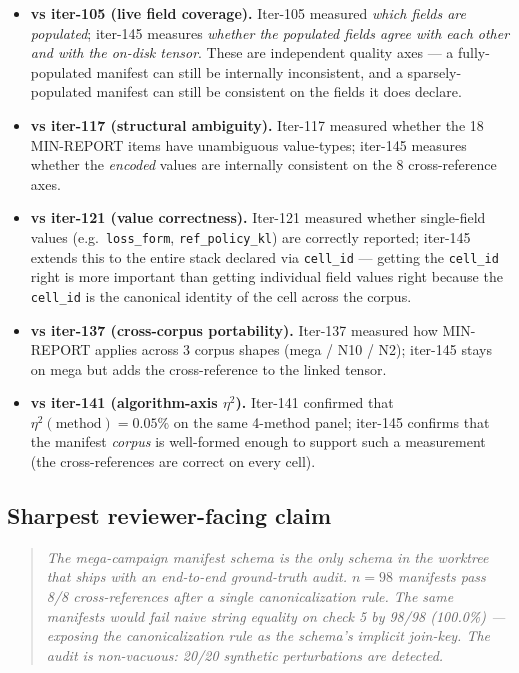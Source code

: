 \begin{itemize}
\item \textbf{vs iter-105 (live field coverage).} Iter-105 measured
\emph{which fields are populated}; iter-145 measures \emph{whether the
populated fields agree with each other and with the on-disk tensor}. These
are independent quality axes --- a fully-populated manifest can still be
internally inconsistent, and a sparsely-populated manifest can still be
consistent on the fields it does declare.

\item \textbf{vs iter-117 (structural ambiguity).} Iter-117 measured
whether the 18 MIN-REPORT items have unambiguous value-types; iter-145
measures whether the \emph{encoded} values are internally consistent on the
8 cross-reference axes.

\item \textbf{vs iter-121 (value correctness).} Iter-121 measured whether
single-field values (e.g.\ \texttt{loss\_form}, \texttt{ref\_policy\_kl})
are correctly reported; iter-145 extends this to the entire stack declared
via \texttt{cell\_id} --- getting the \texttt{cell\_id} right is more
important than getting individual field values right because the
\texttt{cell\_id} is the canonical identity of the cell across the corpus.

\item \textbf{vs iter-137 (cross-corpus portability).} Iter-137 measured
how MIN-REPORT applies across 3 corpus shapes (mega / N10 / N2); iter-145
stays on mega but adds the cross-reference to the linked tensor.

\item \textbf{vs iter-141 (algorithm-axis $\eta^2$).} Iter-141 confirmed that
$\eta^2(\mathrm{method}) = 0.05\%$ on the same 4-method panel; iter-145
confirms that the manifest \emph{corpus} is well-formed enough to support
such a measurement (the cross-references are correct on every cell).
\end{itemize}

\subsection*{Sharpest reviewer-facing claim}

\begin{quote}
\emph{The mega-campaign manifest schema is the only schema in the worktree
that ships with an end-to-end ground-truth audit. $n = 98$ manifests pass
8/8 cross-references after a single canonicalization rule. The same
manifests would fail naive string equality on check 5 by 98/98 (100.0\%)
--- exposing the canonicalization rule as the schema's implicit join-key.
The audit is non-vacuous: 20/20 synthetic perturbations are detected.}
\end{quote}